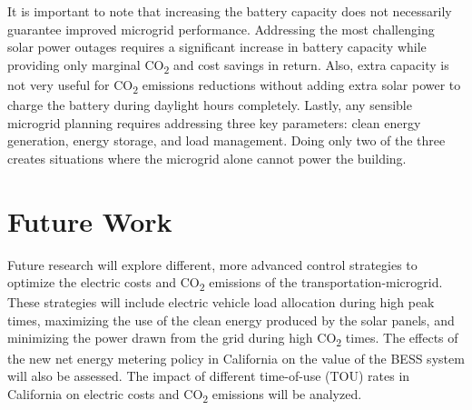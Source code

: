 \documentclass[conference, usletter]{IEEEtran}
\begin{document}
It is important to note that increasing the battery capacity does not necessarily guarantee improved microgrid performance. Addressing the most challenging solar power outages requires a significant increase in battery capacity while providing only marginal CO\textsubscript{2} and cost savings in return. Also, extra capacity is not very useful for CO\textsubscript{2} emissions reductions without adding extra solar power to charge the battery during daylight hours completely. Lastly, any sensible microgrid planning requires addressing three key parameters: clean energy generation, energy storage, and load management. Doing only two of the three creates situations where the microgrid alone cannot power the building.
\section{Future Work}
Future research will explore different, more advanced control strategies to optimize the electric costs and CO\textsubscript{2} emissions of the transportation-microgrid. These strategies will include electric vehicle load allocation during high peak times, maximizing the use of the clean energy produced by the solar panels, and minimizing the power drawn from the grid during high CO\textsubscript{2} times. The effects of the new net energy metering policy in California on the value of the BESS system will also be assessed. The impact of different time-of-use (TOU) rates in California on electric costs and CO\textsubscript{2} emissions will be analyzed.


		
		
	
\end{document}
